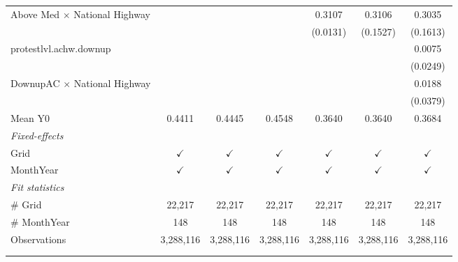 \begin{table}[htbp]
\begin{tabular}{lcccccc}
      Above Med $\times$ National Highway  &               &               &               & 0.3107        & 0.3106        & 0.3035\\   
                                           &               &               &               & (0.0131)      & (0.1527)      & (0.1613)\\   
      protestlvl.achw.downup               &               &               &               &               &               & 0.0075\\   
                                           &               &               &               &               &               & (0.0249)\\   
      DownupAC $\times$ National Highway   &               &               &               &               &               & 0.0188\\   
                                           &               &               &               &               &               & (0.0379)\\   
      \hline Mean Y0                       & 0.4411        & 0.4445        & 0.4548        & 0.3640        & 0.3640        & 0.3684\\  
      \midrule
      \emph{Fixed-effects}\\
      Grid                                 & $\checkmark$  & $\checkmark$  & $\checkmark$  & $\checkmark$  & $\checkmark$  & $\checkmark$\\   
      MonthYear                            & $\checkmark$  & $\checkmark$  & $\checkmark$  & $\checkmark$  & $\checkmark$  & $\checkmark$\\   
      \midrule
      \emph{Fit statistics}\\
      \# Grid                              & 22,217        & 22,217        & 22,217        & 22,217        & 22,217        & 22,217\\  
      \# MonthYear                         & 148           & 148           & 148           & 148           & 148           & 148\\  
      Observations                         & 3,288,116     & 3,288,116     & 3,288,116     & 3,288,116     & 3,288,116     & 3,288,116\\  
      \midrule \midrule
                                           &               &               &               &               &               &  \tabularnewline 
      \\
   \end{tabular}
\end{table}


